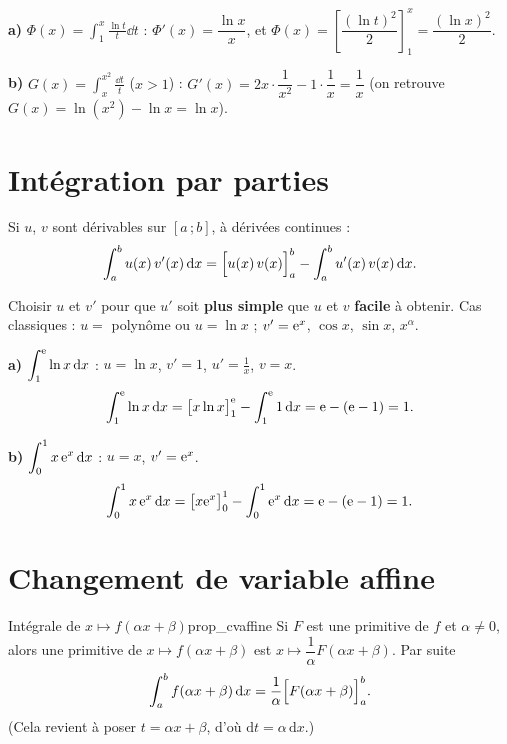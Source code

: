 \begin{exemple}
	\textbf{a)} $\Phi(x)=\displaystyle\int_1^{x}\frac{\ln t}{t}\dd t$ :
	$\Phi'(x)=\dfrac{\ln x}{x}$, et
	$\Phi(x)=\left[\dfrac{(\ln t)^{2}}{2}\right]_1^{x}=\dfrac{(\ln x)^{2}}{2}$.

	\textbf{b)} $G(x)=\displaystyle\int_{x}^{x^{2}}\frac{\dd t}{t}$ ($x>1$) :
	$G'(x)=2x\cdot\dfrac{1}{x^{2}}-1\cdot\dfrac{1}{x}=\dfrac{1}{x}$
	(on retrouve $G(x)=\ln(x^{2})-\ln x=\ln x$).
\end{exemple}


\section{Intégration par parties}

\begin{theoreme}
	Si $u$, $v$ sont dérivables sur $[a\,;b]$, à dérivées continues :
	\[
	\int_a^b u(x)\,v'(x)\,\mathrm{d} x
	=\Bigl[u(x)\,v(x)\Bigr]_a^b-\int_a^b u'(x)\,v(x)\,\mathrm{d} x.
	\]
\end{theoreme}

\begin{methode}
	Choisir $u$ et $v'$ pour que $u'$ soit \textbf{plus simple} que $u$ et $v$
	\textbf{facile} à obtenir. Cas classiques : $u=$ polynôme ou $u=\ln x$ ;
	$v'=\mathrm{e}^{x}$, $\cos x$, $\sin x$, $x^{\alpha}$.
\end{methode}

\begin{exemple}
	\textbf{a)} $\displaystyle\int_1^{\mathrm{e}}\ln x\,\mathrm{d} x$ : $u=\ln x$, $v'=1$,
	$u'=\tfrac1x$, $v=x$.
	\[
	\int_1^{\mathrm{e}}\ln x\,\mathrm{d} x=\bigl[x\ln x\bigr]_1^{\mathrm{e}}-\int_1^{\mathrm{e}}1\,\mathrm{d} x
	=\mathrm{e}-(\mathrm{e}-1)=1.
	\]

	\textbf{b)} $\displaystyle\int_0^1 x\,\mathrm{e}^{x}\,\mathrm{d} x$ : $u=x$, $v'=\mathrm{e}^{x}$.
	\[
	\int_0^1 x\,\mathrm{e}^{x}\,\mathrm{d} x=\bigl[x\mathrm{e}^{x}\bigr]_0^1-\int_0^1\mathrm{e}^{x}\,\mathrm{d} x
	=\mathrm{e}-(\mathrm{e}-1)=1.
	\]
\end{exemple}


\section{Changement de variable affine}

\begin{propriete}{Intégrale de $x\mapsto f(\alpha x+\beta)$}{prop_cvaffine}
	Si $F$ est une primitive de $f$ et $\alpha\neq 0$, alors une primitive de
	$x\mapsto f(\alpha x+\beta)$ est $x\mapsto\dfrac{1}{\alpha}F(\alpha x+\beta)$.
	Par suite
	\[
	\int_a^b f(\alpha x+\beta)\,\mathrm{d} x
	=\frac{1}{\alpha}\Bigl[F(\alpha x+\beta)\Bigr]_a^b .
	\]
	(Cela revient à poser $t=\alpha x+\beta$, d'où $\mathrm{d}t=\alpha\,\mathrm{d}x$.)
\end{propriete}

